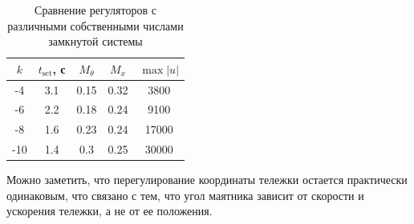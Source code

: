 \begin{table}[ht!]
    \centering
    \begin{tabular}{|c|c|c|c|c|}
        \hline
        $k$ & $t_{\text{set}}$, с & $M_{\theta}$ & $M_{x}$ & $\max{|u|}$ \\
        \hline
        -4 & 3.1 & 0.15 & 0.32 & 3800 \\
        \hline
        -6 & 2.2 & 0.18 & 0.24 & 9100 \\
        \hline
        -8 & 1.6 & 0.23 & 0.24 & 17000 \\
        \hline
        -10 & 1.4 & 0.3 & 0.25 & 30000 \\
        \hline
    \end{tabular}
    \caption{Сравнение регуляторов с различными собственными числами замкнутой системы}
    \label{tab:modal_control_cmp}
\end{table}

Можно заметить, что перегулирование координаты тележки остается практически одинаковым, 
что связано с тем, что угол маятника зависит от скорости и ускорения тележки, а не от ее положения. 

